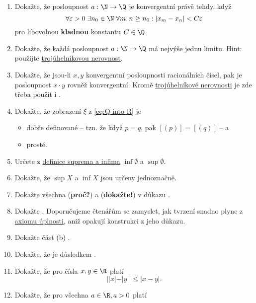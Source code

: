 \section*{}

\begin{enumerate}
 \item Dokažte, že posloupnost $a:\N \to \Q$ je konvergentní právě tehdy, když
  \[
   \forall \varepsilon>0 \; \exists n_0 \in \N \; \forall m,n \geq n_0: |x_m -
   x_n| < C\varepsilon
  \]
  pro libovolnou \textbf{kladnou} konstantu $C \in \Q$.
 \item Dokažte, že každá posloupnost $a:\N \to \Q$ má nejvýše jednu limitu.
  Hint: použijte \hyperref[lem:trojuhelnikova-nerovnost]{trojúhelníkovou
  nerovnost}.
 \item Dokažte, že jsou-li $x,y$ konvergentní posloupnosti racionálních čísel,
  pak je posloupnost $x \cdot y$ rovněž konvergentní. Kromě
  \hyperref[lem:trojuhelnikova-nerovnost]{trojúhelníkové nerovnosti} je zde
  třeba použít i .
 \item Dokažte, že zobrazení $\xi$ z \eqref{eq:Q-into-R} je
  \begin{itemize}
   \item dobře definované -- tzn. že když $p = q$, pak $[(p)] = [(q)]$ -- a
   \item prosté.
  \end{itemize}
 \item Určete z \hyperref[def:supremum-a-infimum]{definice suprema a infima}
  $\inf \emptyset$ a $\sup \emptyset$.
 \item Dokažte, že $\sup X$ a $\inf X$ jsou určeny jednoznačně.
 \item Dokažte všechna (\textbf{proč?}) a (\textbf{dokažte!}) v důkazu
  .
 \item Dokažte . Doporučujeme čtenářům se
  zamyslet, jak tvrzení snadno plyne z \hyperref[prop:axiom-uplnosti]{axiomu
  úplnosti}, aniž opakují konstrukci z jeho důkazu.
 \item Dokažte část (b) .
 \item Dokažte, že  je
  důsledkem .
 \item Dokažte, že pro čísla $x,y \in \R$ platí
  \[
   | |x| - |y| | \leq |x - y|.
  \]
 \item Dokažte, že pro všechna $a \in \R, a > 0$ platí

\end{enumerate}
